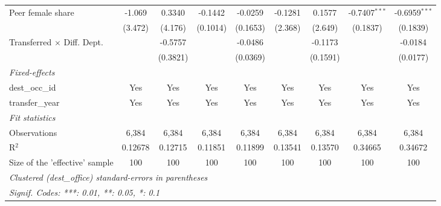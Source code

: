 \begin{table}[htbp]
\begin{threeparttable}
\begin{tabular}{lcccccccc}
   Peer female share                 & -1.069          & 0.3340          & -0.1442         & -0.0259         & -0.1281         & 0.1577          & -0.7407$^{***}$ & -0.6959$^{***}$\\   
                                     & (3.472)         & (4.176)         & (0.1014)        & (0.1653)        & (2.368)         & (2.649)         & (0.1837)        & (0.1839)\\   
   Transferred $\times$ Diff. Dept.  &                 & -0.5757         &                 & -0.0486         &                 & -0.1173         &                 & -0.0184\\   
                                     &                 & (0.3821)        &                 & (0.0369)        &                 & (0.1591)        &                 & (0.0177)\\   
   \midrule
   \emph{Fixed-effects}\\
   dest\_occ\_id                     & Yes             & Yes             & Yes             & Yes             & Yes             & Yes             & Yes             & Yes\\  
   transfer\_year                    & Yes             & Yes             & Yes             & Yes             & Yes             & Yes             & Yes             & Yes\\  
   \midrule
   \emph{Fit statistics}\\
   Observations                      & 6,384           & 6,384           & 6,384           & 6,384           & 6,384           & 6,384           & 6,384           & 6,384\\  
   R$^2$                             & 0.12678         & 0.12715         & 0.11851         & 0.11899         & 0.13541         & 0.13570         & 0.34665         & 0.34672\\  
   Size of the 'effective' sample    & 100             & 100             & 100             & 100             & 100             & 100             & 100             & 100\\  
   \midrule \midrule
   \multicolumn{9}{l}{\emph{Clustered (dest\_office) standard-errors in parentheses}}\\
   \multicolumn{9}{l}{\emph{Signif. Codes: ***: 0.01, **: 0.05, *: 0.1}}\\
\end{tabular}
\begin{tablenotes}[flushleft]\footnotesize

\end{tablenotes}
\end{threeparttable}
\end{table}

